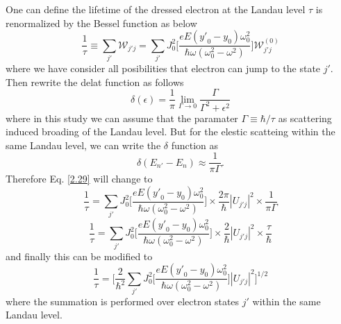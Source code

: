 \noindent
One can define the lifetime of the dressed electron at the Landau level $\tau$ is renormalized by the Bessel function as below
\begin{equation} \label{2.29}
    \frac{1}{\tau} \equiv \sum_{j'} \mathcal{W}_{j'j} =
    \sum_{j'}
    J_0^2\bigg[\frac{eE({y'}_0 - y_0)\omega_0^2}{\hbar\omega(\omega_0^2-\omega^2)}\bigg]
    \mathcal{W}_{j'j}^{(0)}
\end{equation}
where we have consider all posibilities that electron can jump to the state $j'$. Then rewrite the delat function as follows
\begin{equation} \label{2.30}
    \delta(\epsilon) =
    \frac{1}{\pi} \lim_{\Gamma \rightarrow 0 } \frac{\Gamma}{\Gamma^2 + \epsilon^2}
\end{equation}
where in this study we can assume that the paramater $\Gamma \equiv \hbar/\tau$ as scattering induced broading of the Landau level. But for the elestic scatteing within the same Landau level, we can write the $\delta$ function as
\begin{equation} \label{2.31}
    \delta(E_{n'} - E_{n}) \approx
    \frac{1}{\pi \Gamma}.
\end{equation}
Therefore Eq. \eqref{2.29} will change to
\begin{equation} \label{2.32}
    \frac{1}{\tau} =
    \sum_{j'}
    J_0^2\bigg[\frac{eE({y'}_0 - y_0)\omega_0^2}{\hbar\omega(\omega_0^2-\omega^2)}\bigg]
    \times
    \frac{2\pi}{\hbar} |U_{j'j}|^2 \times \frac{1}{\pi \Gamma}
\end{equation}
\begin{equation} \label{2.33}
    \frac{1}{\tau} =
    \sum_{j'}
    J_0^2\bigg[\frac{eE({y'}_0 - y_0)\omega_0^2}{\hbar\omega(\omega_0^2-\omega^2)}\bigg]
    \times
    \frac{2}{\hbar} |U_{j'j}|^2 \times \frac{\tau}{\hbar}
\end{equation}
and finally this can be modified to
\begin{equation} \label{2.34}
    \frac{1}{\tau} =
    \bigg[
    \frac{2}{\hbar^2}
    \sum_{j'}
    J_0^2\bigg[\frac{eE({y'}_0 - y_0)\omega_0^2}{\hbar\omega(\omega_0^2-\omega^2)}\bigg]
    |U_{j'j}|^2
    \bigg]^{1/2}
\end{equation}
where the summation is performed over electron states $j'$ within the same Landau level.

